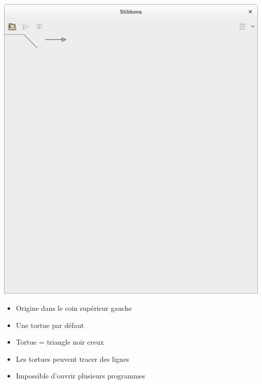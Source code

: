 \begin{frame}
\begin{center}
\includegraphics[scale=0.16]{doc/report/screenshot/stibbons-0-1-2.png}
\end{center}

\begin{itemize}
	\item Origine dans le coin supérieur gauche
	\item Une tortue par défaut
	\item Tortue = triangle noir creux
	\item Les tortues peuvent tracer des lignes
	\item Impossible d'ouvrir plusieurs programmes
\end{itemize}
\end{frame}

